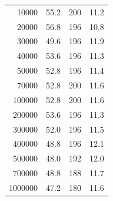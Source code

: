 \documentclass[a4paper,11pt,xelatex,ja=standard]{bxjsarticle}
\begin{document}
\begin{table}[H]
\begin{tabular}{rrrr}
                10000 & 55.2 & 200 & 11.2 \\
                20000 & 56.8 & 196 & 10.8 \\
                30000 & 49.6 & 196 & 11.9 \\
                40000 & 53.6 & 196 & 11.3 \\
                50000 & 52.8 & 196 & 11.4 \\
                70000 & 52.8 & 200 & 11.6 \\
                100000 & 52.8 & 200 & 11.6 \\
                200000 & 53.6 & 196 & 11.3 \\
                300000 & 52.0 & 196 & 11.5 \\
                400000 & 48.8 & 196 & 12.1 \\
                500000 & 48.0 & 192 & 12.0 \\
                700000 & 48.8 & 188 & 11.7 \\
                1000000 & 47.2 & 180 & 11.6 \\
                \hline
            \end{tabular}
        \end{table}
\end{document}
